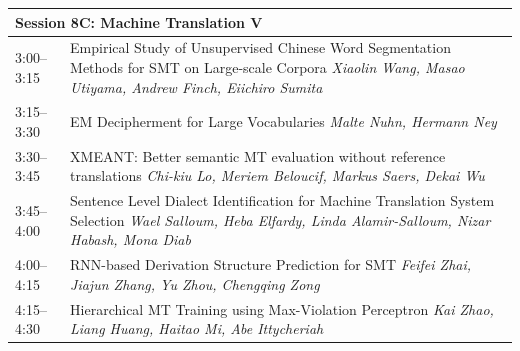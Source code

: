 \documentclass{book}
\renewcommand{\large}{\fontsize{36}{40}\selectfont}
\begin{document}
\begin{tabular}{p{3in}p{16in}}
  \multicolumn{2}{l}{\bfseries\large Session 8C: Machine Translation V} \\\hline

    
    3:00--3:15
    &	Empirical Study of Unsupervised Chinese Word Segmentation Methods for SMT on Large-scale Corpora \newline 
    {\itshape Xiaolin Wang, Masao Utiyama, Andrew Finch, Eiichiro Sumita} \\
    
    3:15--3:30
    &	EM Decipherment for Large Vocabularies \newline 
    {\itshape Malte Nuhn, Hermann Ney} \\
    
    3:30--3:45
    &	XMEANT: Better semantic MT evaluation without reference translations \newline 
    {\itshape Chi-kiu Lo, Meriem Beloucif, Markus Saers, Dekai Wu} \\
    
    3:45--4:00
    &	Sentence Level Dialect Identification for Machine Translation System Selection \newline 
    {\itshape Wael Salloum, Heba Elfardy, Linda Alamir-Salloum, Nizar Habash, Mona Diab} \\
    
    4:00--4:15
    &	RNN-based Derivation Structure Prediction for SMT \newline 
    {\itshape Feifei Zhai, Jiajun Zhang, Yu Zhou, Chengqing Zong} \\
    
    4:15--4:30
    &	Hierarchical MT Training using Max-Violation Perceptron \newline 
    {\itshape Kai Zhao, Liang Huang, Haitao Mi, Abe Ittycheriah} \\
    
\end{tabular}
\end{document}

